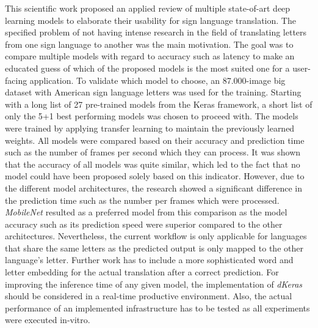 This scientific work proposed an applied review of multiple state-of-art deep learning models to elaborate their usability for sign language translation. The specified problem of not having intense research in the field of translating letters from one sign language to another was the main motivation. The goal was to compare multiple models with regard to accuracy such as latency to make an educated guess of which of the proposed models is the most suited one for a user-facing application. To validate which model to choose, an 87.000-image big dataset with American sign language letters was used for the training. Starting with a long list of 27 pre-trained models from the Keras framework, a short list of only the 5+1 best performing models was chosen to proceed with. The models were trained by applying transfer learning to maintain the previously learned weights. All models were compared based on their accuracy and prediction time such as the number of frames per second which they can process. It was shown that the accuracy of all models was quite similar, which led to the fact that no model could have been proposed solely based on this indicator. However, due to the different model architectures, the research showed a significant difference in the prediction time such as the number per frames which were processed. \textit{MobileNet} resulted as a preferred model from this comparison as the model accuracy such as its prediction speed were superior compared to the other architectures.
Nevertheless, the current workflow is only applicable for languages that share the same letters as the predicted output is only mapped to the other language's letter. Further work has to include a more sophisticated word and letter embedding for the actual translation after a correct prediction. For improving the inference time of any given model, the implementation of \textit{dKeras} should be considered in a real-time productive environment.
Also, the actual performance of an implemented infrastructure has to be tested as all experiments were executed in-vitro.